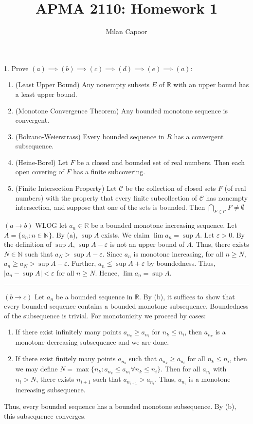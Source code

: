 \documentclass[12pt]{article}
\title{APMA 2110: Homework 1}
\author{Milan Capoor}
\date{}
\newcommand{\R}{\mathbb{R}}
\newcommand{\N}{\mathbb{N}}
\newcommand{\abs}[1]{\left\vert #1 \right\vert}
\newcommand{\ep}{\varepsilon}
\renewcommand{\div}{\vspace*{10pt}\hrule\vspace*{10pt}}
\begin{document}
\maketitle

1. Prove $(a) \implies (b) \implies (c) \implies (d) \implies (e) \implies (a)$:
\begin{enumerate}[label=(\alph*)]
    \item (Least Upper Bound) Any nonempty subsets $E$ of $\R$ with an upper bound has a least upper bound.
    \item (Monotone Convergence Theorem) Any bounded monotone sequence is convergent.
    \item (Bolzano-Weierstrass) Every bounded sequence in $R$ has a convergent subsequence.
    \item (Heine-Borel) Let $F$ be a closed and bounded set of real numbers. Then
    each open covering of $F$ has a finite subcovering.
    \item (Finite Intersection Property) Let $\mathcal C$ be the collection of closed sets $F$ (of real numbers) with the property that every finite subcollection of $\mathcal C$ has nonempty intersection, and suppose that one of the sets is bounded. Then $\bigcap_{F \in \mathcal C} F \neq \emptyset$
\end{enumerate}

\color{blue}
    $(a \to b)$ WLOG let $a_n \in \R$ be a bounded monotone increasing sequence. Let $A = \{a_n : n \in \N\}$. By (a), $\sup A$ exists. We claim $\lim a_n = \sup A$. Let $\ep > 0$. By the definition of $\sup A$, $\sup A - \ep$ is not an upper bound of $A$. Thus, there exists $N \in \N$ such that $a_N > \sup A - \ep$. Since $a_n$ is monotone increasing, for all $n \geq N$, $a_n \geq a_N > \sup A - \ep$. Further, $a_n \leq \sup A + \ep$ by boundedness. Thus, $\abs{a_n - \sup A} < \ep$ for all $n \geq N$. Hence, $\lim a_n = \sup A$.

    \div 

    $(b \to c)$ Let $a_n$ be a bounded sequence in $\R$. By (b), it suffices to show that every bounded sequence contains a bounded monotone subsequence. Boundedness of the subsequence is trivial. For monotonicity we proceed by cases:
    \begin{enumerate}
        \item If there exist infinitely many points $a_{n_k} \geq a_{n_i}$ for $n_k \leq n_i$, then $a_{n_k}$ is a monotone decreasing subsequence and we are done. 
        \item If there exist finitely many points $a_{n_k}$ such that $a_{n_k} \geq a_{n_i}$ for all $n_k \leq n_i$, then we may define $N = \max\{n_k: a_{n_k} \leq a_{n_i} \forall n_k \leq n_i\}$. Then for all $a_{n_i}$ with $n_i > N$, there exists $n_{i+1}$ such that $a_{n_{i+1}} > a_{n_i}$. Thus, $a_{n_i}$ is a monotone increasing subsequence.
    \end{enumerate}
    Thus, every bounded sequence has a bounded monotone subsequence. By (b), this subsequence converges.
\end{document}
